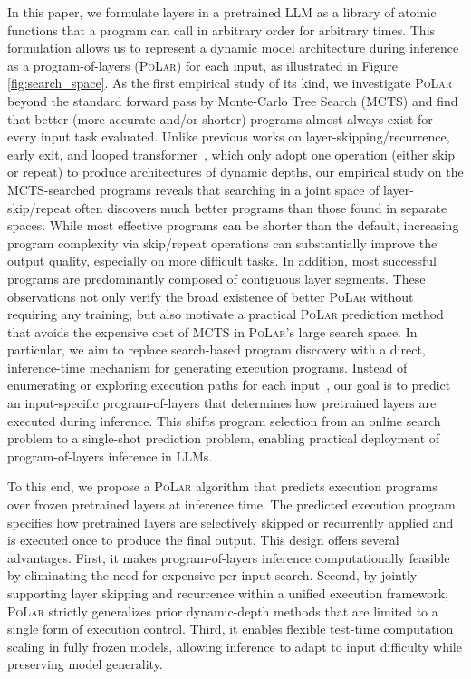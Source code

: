 \documentclass{article}
\theoremstyle{plain}
\theoremstyle{definition}
\theoremstyle{remark}
\newcommand\ours{\textsc{PoLar}\xspace}
\begin{document}
In this paper, we formulate layers in a pretrained LLM as a library of atomic functions that a program can call in arbitrary order for arbitrary times. This formulation allows us to represent a dynamic model architecture during inference as a program-of-layers (\ours) for each input, as illustrated in Figure \ref{fig:search_space}.
As the first empirical study of its kind, we investigate \ours beyond the standard forward pass by Monte-Carlo Tree Search (MCTS) and find that better (more accurate and/or shorter) programs almost always exist for every input task evaluated. Unlike previous works on layer-skipping/recurrence, early exit, and looped transformer~\cite{liu2020fastbert,xin2020deebert,zhou2020bert,fan2019reducing,fan2024looped,yang2023looped}, which only adopt one operation (either skip or repeat) to produce architectures of dynamic depths, our empirical study on the MCTS-searched programs reveals that searching in a joint space of layer-skip/repeat often discovers much better programs than those found in separate spaces. While most effective programs can be shorter than the default, increasing program complexity via skip/repeat operations can substantially improve the output quality, especially on more difficult tasks. In addition, most successful programs are predominantly composed of contiguous layer segments. These observations not only verify the broad existence of better \ours without requiring any training, but also motivate a practical \ours prediction method that avoids the expensive cost of MCTS in \ours's large search space. In particular, 
we aim to replace search-based program discovery with a direct, inference-time mechanism for generating execution programs.
Instead of enumerating or exploring execution paths for each input~\cite{li2025skip}, our goal is to predict an input-specific program-of-layers that determines how pretrained layers are executed during inference.
This shifts program selection from an online search problem to a single-shot prediction problem, enabling practical deployment of program-of-layers inference in LLMs.






To this end, we propose a \ours algorithm that predicts execution programs over frozen pretrained layers at inference time.
The predicted execution program specifies how pretrained layers are selectively skipped or recurrently applied and is executed once to produce the final output.
This design offers several advantages.
First, it makes program-of-layers inference computationally feasible by eliminating the need for expensive per-input search.
Second, by jointly supporting layer skipping and recurrence within a unified execution framework, \ours strictly generalizes prior dynamic-depth methods that are limited to a single form of execution control.
Third, it enables flexible test-time computation scaling in fully frozen models, allowing inference to adapt to input difficulty while preserving model generality.
\end{document}

